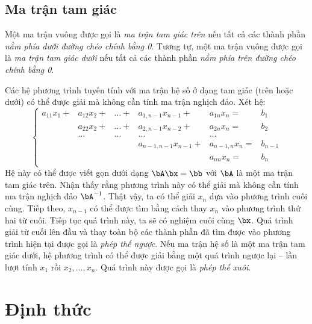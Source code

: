 \subsection{Ma trận tam giác} %
\label{sub:ma_tran_tam_giac}

Một ma trận vuông được gọi là \textit{ma trận tam giác trên} nếu tất cả các
thành phần \textit{nằm phía dưới đường chéo chính bằng 0}. Tương tự, một ma trận
vuông được gọi là \textit{ma trận tam giác dưới} nếu tất cả các thành phần
\textit{nằm phía trên đường chéo chính bằng 0}. 


Các hệ phương trình tuyến tính với ma trận hệ số ở dạng tam giác (trên hoặc
dưới) có thể được giải mà không cần tính ma trận nghịch đảo. Xét hệ:
\begin{equation}
    \left\{
    \begin{matrix}
    a_{11}x_1 + &a_{12}x_2 + &\dots + &a_{1,n-1}x_{n-1} + & a_{1n}x_n= & b_1 \\
                &a_{22}x_2 + &\dots + &a_{2, n-1}x_{n-2} + &a_{2n}x_n = & b_2 \\
                             &\dots  & \dots & \dots    & \dots \\
                & &    &a_{n-1,n-1}x_{n-1} + &a_{n-1, n}x_n = & b_{n-1} \\
                & &    & &a_{nn}x_n = & b_{n} \\
    \end{matrix}
    \right.
\end{equation}
Hệ này có thể được viết gọn dưới dạng $\bA\bx = \bb$ với $\bA$ là một ma trận
tam giác trên. Nhận thấy rằng phương trình này có thể giải mà không cần tính ma
trận nghịch đảo $\bA^{-1}$. Thật vậy, ta có thể giải $x_n$ dựa vào phương trình
cuối cùng. Tiếp theo, $x_{n-1}$ có thể được tìm bằng cách thay $x_n$ vào phương
trình thứ hai từ cuối. Tiếp tục quá trình này, ta sẽ có nghiệm cuối cùng $\bx$.
Quá trình giải từ cuối lên đầu và thay toàn bộ các thành phần đã tìm được vào
phương trình
hiện tại được gọi là \textit{phép thế ngược}. Nếu ma trận hệ số là một ma
trận tam giác dưới, hệ phương trình có thể được giải bằng một quá trình ngược lại  --  lần lượt tính $x_1$ rồi $x_2, \dots, x_n$. Quá trình này được gọi là \textit{phép thế xuôi}.



\section{Định thức} %
\label{sec:dinh_thuc}
